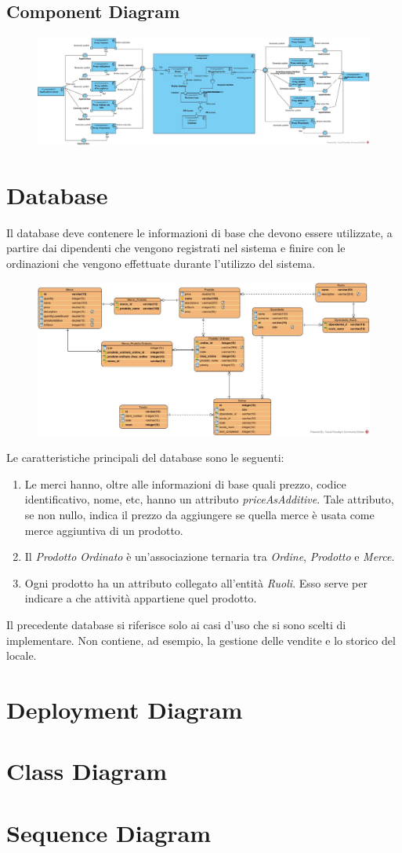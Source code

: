 \subsection{Component Diagram}
\begin{figure}[H]
	\centering
	\includegraphics[width=1\textwidth]{Immagini/dynamic components.jpg}
\end{figure}

\section{Database}
Il database deve contenere le informazioni di base che devono essere utilizzate, a partire dai dipendenti che vengono registrati nel sistema e finire con le ordinazioni che vengono effettuate durante l'utilizzo del sistema.
\begin{figure}[H]
	\centering
	\includegraphics[width=1\textwidth]{Immagini/database.jpg}
\end{figure}
Le caratteristiche principali del database sono le seguenti:
\begin{enumerate}
	\item Le merci hanno, oltre alle informazioni di base quali prezzo, codice identificativo, nome, etc, hanno un attributo \textit{priceAsAdditive}. Tale attributo, se non nullo, indica il prezzo da aggiungere se quella merce è usata come merce aggiuntiva di un prodotto.
	\item Il \textit{Prodotto Ordinato} è un'associazione ternaria tra \textit{Ordine}, \textit{Prodotto} e \textit{Merce}.
	 \item Ogni prodotto ha un attributo collegato all'entità \textit{Ruoli}. Esso serve per indicare a che attività appartiene quel prodotto.
\end{enumerate}
Il precedente database si riferisce solo ai casi d'uso che si sono scelti di implementare. Non contiene, ad esempio, la gestione delle vendite e lo storico del locale.

\section{Deployment Diagram}
\section{Class Diagram}
\section{Sequence Diagram}